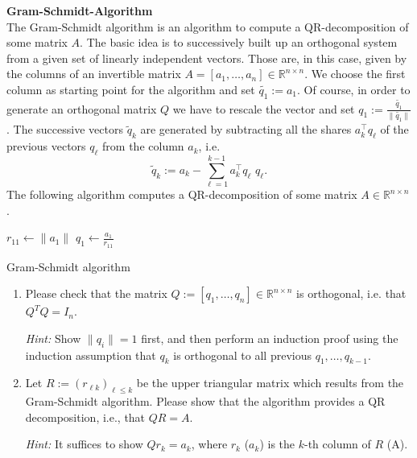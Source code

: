 \textbf{Gram-Schmidt-Algorithm}\\
{\color{navy}
	The Gram-Schmidt algorithm is an algorithm to compute a QR-decomposition of some matrix $A$.
	The basic idea is to successively 
	built up an orthogonal system from a given set of linearly independent vectors. Those are, in this case, given by the columns of an invertible matrix 
	$A = [a_1, \dots, a_n] \in \mathbb{R}^{n\times n}$.
	We choose the first column as starting point for the algorithm and set $\widetilde{q_1} := a_1$. 
	Of course, in order to generate an orthogonal matrix $Q$ we have to rescale the vector and set
	$q_1 := \frac{\widetilde{q_1}}{\| \widetilde{q_1} \|}$.
	The successive vectors $\widetilde{q}_k$ are generated by
	subtracting all the shares $a_k^\top q_\ell$ of the previous vectors $q_\ell$ from the column $a_k$, i.e.
	$$
	\widetilde{q}_k := a_k - \sum_{\ell = 1}^{k-1} a_k^\top q_\ell \,\, q_\ell.
	$$
}
The following algorithm computes a QR-decomposition of some matrix $A \in \mathbb{R}^{n \times n}$.
\begin{algorithm}
	$r_{11} \gets \| a_1 \|$\;
	$q_1 \gets \frac{a_1}{r_{11}}$\;
	\caption{Gram-Schmidt algorithm}
\end{algorithm}
\begin{enumerate}
	\item Please check that the matrix $Q := [q_1, \dots, q_n] \in \mathbb{R}^{n \times n}$ is orthogonal, i.e. that $Q^TQ = I_n$.
	
	\textit{Hint: } Show $\| q_i\| = 1$ first, and then perform an induction proof using the induction assumption that $q_k$ is orthogonal to
	all previous $ q_1,\dots, q_{k-1}$.
	
	\item Let $R := \left(r_{\ell k}\right)_{\ell \leq k}$ be the upper triangular matrix which results from the Gram-Schmidt algorithm. Please show that the algorithm provides a QR decomposition, i.e., that $QR = A$.
	
	\textit{Hint: } It suffices to show $Q r_k = a_k$, where $r_k$ ($a_k$) is the $k$-th column of $R$ (A).
\end{enumerate}